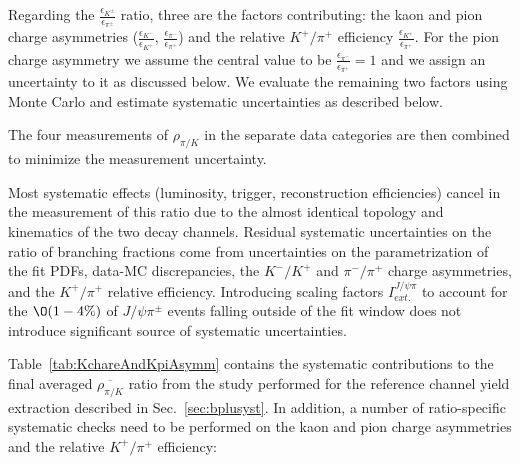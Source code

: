 \begin{table}[!htb]
    \begin{center}
	\label{tab:correctedjpsipi}
    \end{center}
\end{table}

Regarding the $\frac{\epsilon_{ K^{\pm} }}{\epsilon_{\pi^{\pm}}}$ ratio, 
three are the factors contributing:
the kaon and pion charge asymmetries ($\frac{\epsilon_{K^{-}}}{\epsilon_{K^{+}}}$,
$\frac{\epsilon_{\pi^{-}}}{\epsilon_{\pi^{+}}}$) and the relative $K^{+}/\pi^{+}$
efficiency  $\frac{\epsilon_{K^{+}}}{\epsilon_{\pi^{+}}}$. For the pion charge
asymmetry we assume the central value to be $\frac{\epsilon_{\pi^{-}}}{\epsilon_{\pi^{+}}} = 1$
and we assign an uncertainty to it as discussed below. We evaluate the remaining
two factors using Monte Carlo and estimate systematic uncertainties as described
below.

The four measurements of $\rho_{\pi/K}$ in the separate data categories are then
combined to minimize the measurement uncertainty.

Most systematic effects (luminosity, trigger, reconstruction efficiencies)
cancel in the measurement of this ratio due to the almost identical
topology and kinematics of the two decay channels. Residual systematic
uncertainties on the ratio of branching fractions come from uncertainties
on the parametrization of the fit PDFs, data-MC discrepancies, the
$K^{-}/K^{+}$ and $\pi^{-}/\pi^{+}$ charge asymmetries, and the
$K^{+}/\pi^{+}$ relative efficiency. Introducing scaling factors
$I^{J/\psi \pi}_{ext.}$ to account for the $\O(1-4\%)$ of $J/\psi \pi^{\pm}$
events falling outside of the fit window does not introduce significant
source of systematic uncertainties.

Table~\ref{tab:KchareAndKpiAsymm} contains the systematic contributions
to the final averaged $\overline{\rho_{\pi/K}}$ ratio from the study
performed for the reference channel yield extraction described in
Sec.~\ref{sec:bplusyst}. In addition, a number of ratio-specific systematic
checks need to be performed on the kaon and pion charge asymmetries
and the relative $K^{+}/\pi^{+}$ efficiency:

